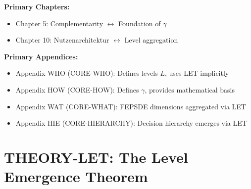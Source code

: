 \begin{tcolorbox}[colback=purple!5!white, colframe=purple!75!black,
    title=Chapter Linkage]

\textbf{Primary Chapters:}
\begin{itemize}[nosep]
\item Chapter 5: Complementarity $\leftrightarrow$ Foundation of $\gamma$
\item Chapter 10: Nutzenarchitektur $\leftrightarrow$ Level aggregation
\end{itemize}

\textbf{Primary Appendices:}
\begin{itemize}[nosep]
\item Appendix WHO (CORE-WHO): Defines levels $L$, uses LET implicitly
\item Appendix HOW (CORE-HOW): Defines $\gamma$, provides mathematical basis
\item Appendix WAT (CORE-WHAT): FEPSDE dimensions aggregated via LET
\item Appendix HIE (CORE-HIERARCHY): Decision hierarchy emerges via LET
\end{itemize}

\end{tcolorbox}


\chapter{THEORY-LET: The Level Emergence Theorem}
\label{app:theory-let}


\begin{abstract}
Why is a team more than a collection of individuals? Why does a family generate
welfare beyond the sum of its members? This appendix provides a formal answer:
the \textbf{Level Emergence Theorem (LET)}. We prove that when complementarity
is positive ($\bar{\gamma} > 0$), aggregate utility at level $L$ strictly exceeds
the sum of utilities at level $ACE-1$. This ``emergence premium'' $\mathcal{E}$
is quantifiable and depends on the variance of member utilities and the strength
of complementarity. The theorem provides the mathematical foundation for the
EBF framework's treatment of multi-level welfare aggregation.
\end{abstract}

